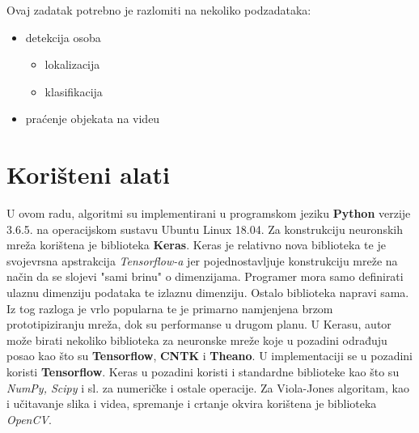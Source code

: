 Ovaj zadatak potrebno je razlomiti na nekoliko podzadataka:
\begin{itemize}
	\item detekcija osoba
	\begin{itemize}
		\item lokalizacija
		\item klasifikacija
	\end{itemize}
	\item praćenje objekata na videu
\end{itemize}


\section{Korišteni alati}

U ovom radu, algoritmi su implementirani u programskom jeziku \textbf{Python} verzije 3.6.5. na operacijskom sustavu Ubuntu Linux 18.04. Za konstrukciju neuronskih mreža korištena je biblioteka \textbf{Keras}. Keras je relativno nova biblioteka te je svojevrsna apstrakcija \textit{Tensorflow-a} jer pojednostavljuje konstrukciju mreže na način da se slojevi "sami brinu" o dimenzijama. Programer mora samo definirati ulaznu dimenziju podataka te izlaznu dimenziju. Ostalo biblioteka napravi sama. Iz tog razloga je vrlo popularna te je primarno namjenjena brzom prototipiziranju mreža, dok su performanse u drugom planu. U Kerasu, autor može birati nekoliko biblioteka za neuronske mreže koje u pozadini odrađuju posao kao što su \textbf{Tensorflow}, \textbf{CNTK} i \textbf{Theano}. U implementaciji se u pozadini koristi \textbf{Tensorflow}. Keras u pozadini koristi i standardne biblioteke kao što su \textit{NumPy, Scipy} i sl. za numeričke i ostale operacije. Za Viola-Jones algoritam, kao i učitavanje slika i videa, spremanje i crtanje okvira korištena je biblioteka \textit{OpenCV}.